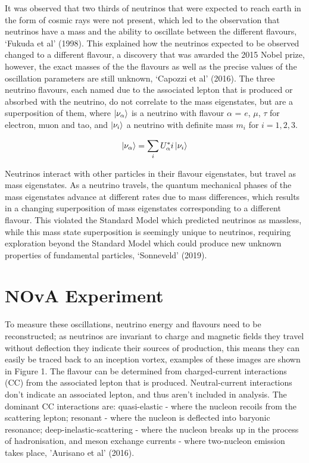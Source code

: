 \documentclass[11pt]{article}
\begin{document}
It was observed that two thirds of neutrinos that were expected to reach earth in the form of cosmic rays were not present, which led to the observation that neutrinos have a mass and  the ability to oscillate between the different flavours, ‘Fukuda et al’ (1998).
This explained how the neutrinos expected to be observed changed to a different flavour, a discovery that was awarded the 2015 Nobel prize, however, the exact masses of the the flavours as well as the precise values of the oscillation parameters are still unknown, ‘Capozzi et al’ (2016). The three neutrino flavours, each named due to the associated lepton that is produced or absorbed with the neutrino, do not correlate to the mass eigenstates, but are a superposition of them, where $\ket{\nu_\alpha}$ is a neutrino with flavour $\alpha$ = $e$, $\mu$, $\tau$ for electron, muon and tao, and $\ket{\nu_i}$  a neutrino with definite mass $m_i$ for $i =1,2,3$.

 \[\ket{\nu_\alpha} = \sum_{i}U^ {*}_\alpha i  \ket{\nu_i}\]

Neutrinos interact with other particles in their flavour eigenstates, but travel as mass eigenstates. As a neutrino travels, the quantum mechanical phases of the mass eigenstates advance at different rates due to mass differences, which results in a changing superposition of mass eigenstates corresponding to a different flavour. This violated the Standard Model which predicted neutrinos as massless, while this mass state superposition is seemingly unique to neutrinos, requiring exploration beyond the Standard Model which could produce new unknown properties of fundamental particles, ‘Sonneveld' (2019). 


\section*{NOvA Experiment}

To measure these oscillations, neutrino energy and flavours need to be reconstructed; as neutrinos are invariant to charge and magnetic fields they travel without deflection they indicate their sources of production, this means they can easily be traced back to an inception vortex, examples of these images are shown in Figure 1. The flavour can be determined from charged-current interactions (CC) from the associated lepton that is produced. Neutral-current interactions don’t indicate an associated lepton, and thus aren’t included in analysis. The dominant CC interactions are: quasi-elastic - where the nucleon recoils from the scattering lepton; resonant - where the nucleon is deflected into baryonic resonance; deep-inelastic-scattering - where the nucleon breaks up in the process of hadronisation, and meson exchange currents -  where two-nucleon emission takes place, 'Aurisano et al' (2016).
\end{document}
